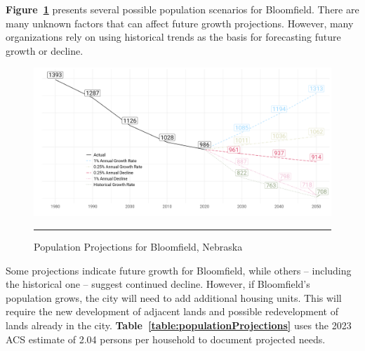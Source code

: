 
\noindent \textbf{Figure~\ref{fig:populationProjections}} presents several possible population scenarios for Bloomfield. There are many unknown factors that can affect future growth projections. However, many organizations rely on using historical trends as the basis for forecasting future growth or decline.\\

\begin{figure}[H]
\centering
\begin{framed}
    \caption{Population Projections for Bloomfield, Nebraska}
    \label{fig:populationProjections}
    \includegraphics[width=\linewidth]{figures/population_projections.png}
    \rule[-5pt]{\linewidth}{0.4pt}
\end{framed}
\end{figure}

\noindent Some projections indicate future growth for Bloomfield, while others -- including the historical one -- suggest continued decline. However, if Bloomfield's population grows, the city will need to add additional housing units. This will require the new development of adjacent lands and possible redevelopment of lands already in the city. \textbf{Table~\ref{table:populationProjections}} uses the 2023 ACS estimate of 2.04 persons per household to document projected needs.

